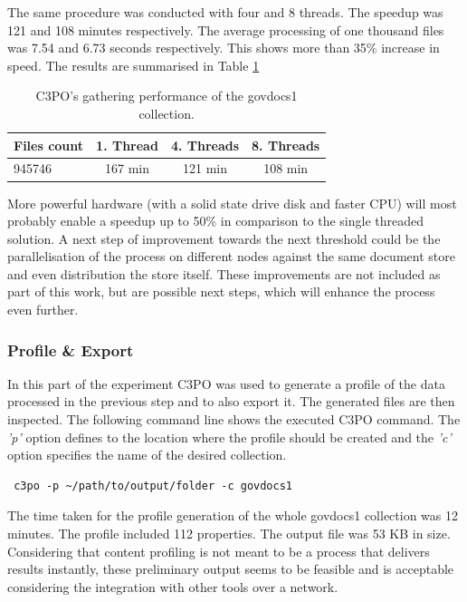 The same procedure was conducted with four and 8 threads.
The speedup was 121 and 108 minutes respectively.
The average processing of one thousand files was 7.54 and 6.73  seconds respectively.
This shows more than 35\% increase in speed. The results are summarised in Table \ref{tab:govdocs_gathering_performance}


\begin{table}[h]
\centering
\begin{tabular}{l || c | c | c }
\hline
Files count & 1. Thread & 4. Threads & 8. Threads \\
\hline
945746 & 167 min & 121 min & 108 min \\
\hline
\end{tabular}
\caption{C3PO's gathering performance of the govdocs1 collection.}
\label{tab:govdocs_gathering_performance}
\end{table}


More powerful hardware (with a solid state drive disk and faster CPU) will most probably enable a speedup up to 50\% in comparison to the single threaded solution.
A next step of improvement towards the next threshold could be the parallelisation of the process on different nodes against the same document store and even distribution the store itself.
These improvements are not included as part of this work, but are possible next steps, which will enhance the process even further.

\subsubsection{Profile \& Export}
In this part of the experiment C3PO was used to generate a profile of the data processed in the previous step and to also export it.
The generated files are then inspected.
The following command line shows the executed C3PO command. The \textit{'p'} option defines to the location where the profile should be created and the \textit{'c'} option specifies the name of the desired collection.

\begin{verbatim}
 c3po -p ~/path/to/output/folder -c govdocs1
\end{verbatim}

The time taken for the profile generation of the whole govdocs1 collection was 12 minutes.
The profile included 112 properties. The output file was 53 KB in size.
Considering that content profiling is not meant to be a process that delivers results instantly, these preliminary output seems to be feasible and is acceptable considering the integration with other tools over a network.

